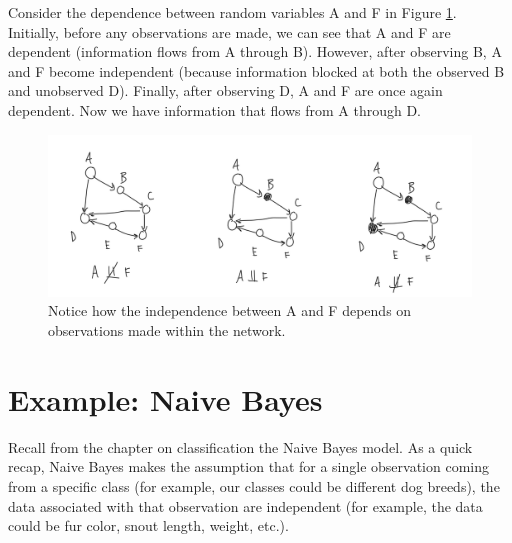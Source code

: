 Consider the dependence between random variables A and F in Figure \ref{fig:information-flow-example}. Initially, before any observations are made, we can see that A and F are dependent (information flows from A through B). However, after observing B, A and F become independent (because information blocked at both the observed B and unobserved D). Finally, after observing D, A and F are once again dependent. Now we have information that flows from A through D.
\begin{figure}
	\centering
	\includegraphics[width=0.5\paperwidth]{../GraphicalModels/fig/information-flow-example.png}
    \caption{Notice how the independence between A and F depends on observations made within the network.}
	\label{fig:information-flow-example}
\end{figure}


\section{Example: Naive Bayes}
Recall from the chapter on classification the Naive Bayes model. As a quick recap, Naive Bayes makes the assumption that for a single observation coming from a specific class (for example, our classes could be different dog breeds), the data associated with that observation are independent (for example, the data could be fur color, snout length, weight, etc.).

